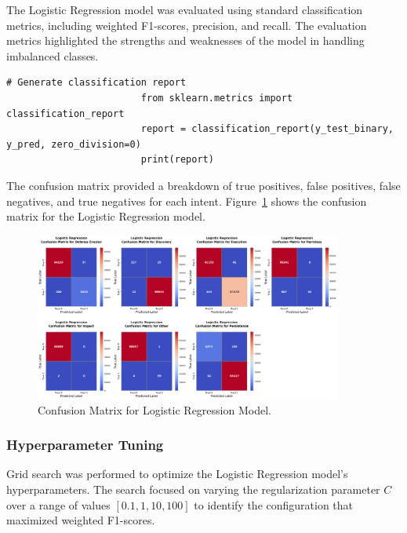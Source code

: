             The Logistic Regression model was evaluated using standard classification metrics, including weighted F1-scores, precision, and recall. The evaluation metrics highlighted the strengths and weaknesses of the model in handling imbalanced classes. 

                \begin{lstlisting}[caption={Generate classification report}, label={lst:logistic_regression_eval}]
                        # Generate classification report
                        from sklearn.metrics import classification_report
                        report = classification_report(y_test_binary, y_pred, zero_division=0)
                        print(report)
                \end{lstlisting}

            The confusion matrix provided a breakdown of true positives, false positives, false negatives, and true negatives for each intent. Figure~\ref{fig:logistic_cm} shows the confusion matrix for the Logistic Regression model.

            \begin{figure}[H]
                \centering
                \includegraphics[width=0.9\textwidth]{../figures/plots/section2/Logistic_Regression_confusion_matrices.png}
                \caption{Confusion Matrix for Logistic Regression Model.}
                \label{fig:logistic_cm}
            \end{figure}

        \subsubsection{Hyperparameter Tuning \\}

            Grid search was performed to optimize the Logistic Regression model's hyperparameters. The search focused on varying the regularization parameter \( C \) over a range of values \([0.1, 1, 10, 100]\) to identify the configuration that maximized weighted F1-scores.

